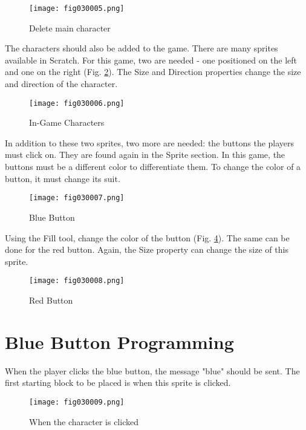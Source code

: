 \begin{figure}[H]
   \centering
   \texttt{[image: fig030005.png]}
   \caption{Delete main character}
\label{fig030005}
\end{figure}

The characters should also be added to the game. There are many sprites available in Scratch. For this game, two are needed - one positioned on the left and one on the right (Fig. \ref{fig030006}). The Size and Direction properties change the size and direction of the character.

\begin{figure}[H]
   \centering
   \texttt{[image: fig030006.png]}
   \caption{In-Game Characters}
\label{fig030006}
\end{figure}

In addition to these two sprites, two more are needed: the buttons the players must click on. They are found again in the Sprite section. In this game, the buttons must be a different color to differentiate them. To change the color of a button, it must change its suit.

\begin{figure}[H]
   \centering
   \texttt{[image: fig030007.png]}
   \caption{Blue Button}
\label{fig030007}
\end{figure}

Using the Fill tool, change the color of the button (Fig. \ref{fig030008}). The same can be done for the red button. Again, the Size property can change the size of this sprite.

\begin{figure}[H]
   \centering
   \texttt{[image: fig030008.png]}
   \caption{Red Button}
\label{fig030008}
\end{figure}

\section{Blue Button Programming}
When the player clicks the blue button, the message "blue" should be sent. The first starting block to be placed is when this sprite is clicked.

\begin{figure}[H]
   \centering
   \texttt{[image: fig030009.png]}
   \caption{When the character is clicked}
\label{fig030009}
\end{figure}

